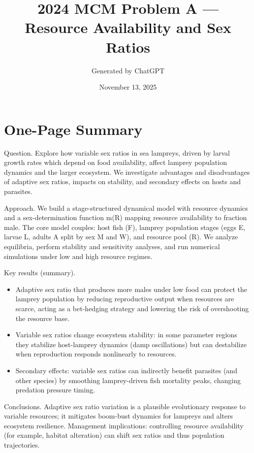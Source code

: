 \documentclass[
]{article}
\title{2024 MCM Problem A --- Resource Availability and Sex Ratios}
\author{Generated by ChatGPT}
\date{November 13, 2025}
\providecommand{\tightlist}{%
  \setlength{\itemsep}{0pt}\setlength{\parskip}{0pt}}
\begin{document}
\maketitle

\section{One-Page Summary}\label{one-page-summary}

Question. Explore how variable sex ratios in sea lampreys, driven by
larval growth rates which depend on food availability, affect lamprey
population dynamics and the larger ecosystem. We investigate advantages
and disadvantages of adaptive sex ratios, impacts on stability, and
secondary effects on hosts and parasites.

Approach. We build a stage-structured dynamical model with resource
dynamics and a sex-determination function m(R) mapping resource
availability to fraction male. The core model couples: host fish (F),
lamprey population stages (eggs E, larvae L, adults A split by sex M and
W), and resource pool (R). We analyze equilibria, perform stability and
sensitivity analyses, and run numerical simulations under low and high
resource regimes.

Key results (summary).

\begin{itemize}
\tightlist
\item
  Adaptive sex ratio that produces more males under low food can protect
  the lamprey population by reducing reproductive output when resources
  are scarce, acting as a bet-hedging strategy and lowering the risk of
  overshooting the resource base.
\item
  Variable sex ratios change ecosystem stability: in some parameter
  regions they stabilize host-lamprey dynamics (damp oscillations) but
  can destabilize when reproduction responds nonlinearly to resources.
\item
  Secondary effects: variable sex ratios can indirectly benefit
  parasites (and other species) by smoothing lamprey-driven fish
  mortality peaks, changing predation pressure timing.
\end{itemize}

Conclusions. Adaptive sex ratio variation is a plausible evolutionary
response to variable resources; it mitigates boom-bust dynamics for
lampreys and alters ecosystem resilience. Management implications:
controlling resource availability (for example, habitat alteration) can
shift sex ratios and thus population trajectories.
\end{document}
